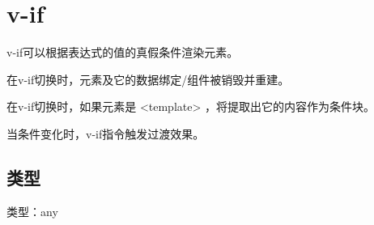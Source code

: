 \begin{lstlisting}[language=JavaScript]

\end{lstlisting}




\begin{lstlisting}[language=JavaScript]

\end{lstlisting}




\begin{lstlisting}[language=JavaScript]

\end{lstlisting}




\begin{lstlisting}[language=JavaScript]

\end{lstlisting}




\begin{lstlisting}[language=JavaScript]

\end{lstlisting}




\begin{lstlisting}[language=JavaScript]

\end{lstlisting}

\section{v-if}

v-if可以根据表达式的值的真假条件渲染元素。

\begin{compactitem}
\item 在v-if切换时，元素及它的数据绑定/组件被销毁并重建。
\item 在v-if切换时，如果元素是 <template> ，将提取出它的内容作为条件块。
\end{compactitem}

当条件变化时，v-if指令触发过渡效果。

\subsection{类型}


\begin{compactitem}
\item 类型：any
\end{compactitem}



